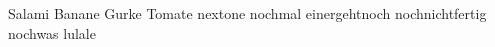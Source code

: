 \documentclass{scrartcl}
\begin{document}
	Salami \cite{Kogel2010} Banane \cite{Espeloer1997} Gurke \cite{Higaonna1985} Tomate \cite{Nakayama2020} nextone \cite{Sebej1998} nochmal \cite{Gsodam1992} einergehtnoch \cite{Tartaglia2019} nochnichtfertig \cite{Higaonna1986,Higaonna1989,Higaonna1990} nochwas \cite{GKD2023} \cite{Noepel2007,Noepel2021} lulale \cite{Test2024}
	\newpage
	\printbibliography
\end{document}
